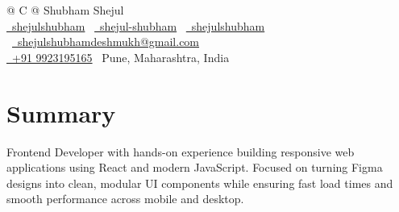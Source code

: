 \documentclass[a4paper,11pt]{article}
\begin{document}
\pagestyle{empty} 




\begin{tabularx}{\linewidth}{@{} C @{}}
\Huge{Shubham Shejul} \\[7.5pt]
\href{https://github.com/shejulshubham}{\raisebox{-0.05\height}\faGithub\ shejulshubham} \textbar\ 
\href{https://www.linkedin.com/in/shejul-shubham}{\raisebox{-0.05\height}\faLinkedin\ shejul-shubham} \textbar\ 
\href{https://shejulshubham.github.io/}{\raisebox{-0.05\height}\faGlobe\ shejulshubham} \textbar\ 
\href{mailto:shejulshubhamdeshmukh@gmail.com}{\raisebox{-0.05\height}\faEnvelope\ shejulshubhamdeshmukh@gmail.com} \\
\href{tel:+919923195165}{\raisebox{-0.05\height}\faMobile\ +91 9923195165} \textbar\
\small{Pune, Maharashtra, India}
\end{tabularx}




\section{Summary}
Frontend Developer with hands-on experience building responsive web applications using React and modern JavaScript. Focused on turning Figma designs into clean, modular UI components while ensuring fast load times and smooth performance across mobile and desktop.
\end{document}
